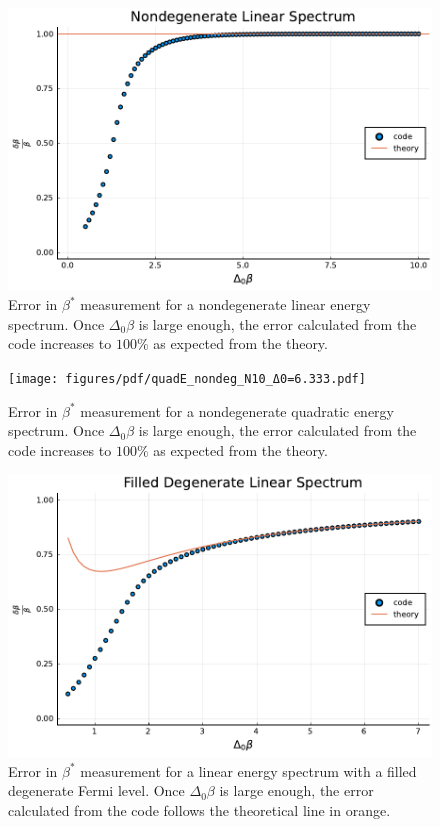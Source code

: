 \begin{figure}[H]
    \centering
    \includegraphics[scale=.75]{figures/pdf/linE_nondeg_N10.pdf}
    \caption{Error in $\beta^*$ measurement for a nondegenerate linear energy spectrum. Once $\Delta_0\beta$ is large enough, the error calculated from the code increases to $100\%$ as expected from the theory. }
    \label{fig:linnondeg}
\end{figure}
\begin{figure}[H]
    \centering
    \texttt{[image: figures/pdf/quadE\_nondeg\_N10\_Δ0=6.333.pdf]}
    \caption{Error in $\beta^*$ measurement for a nondegenerate quadratic energy spectrum. Once $\Delta_0\beta$ is large enough, the error calculated from the code increases to $100\%$ as expected from the theory. }
    \label{fig:quadnondeg}
\end{figure}
\begin{figure}[H]
    \centering
    \includegraphics[scale=0.75]{figures/pdf/linE_filldegen_g0-2_N10.pdf}
    \caption{Error in $\beta^*$ measurement for a linear energy spectrum with a filled degenerate Fermi level. Once $\Delta_0\beta$ is large enough, the error calculated from the code follows the theoretical line in orange.}
    \label{fig:Filled}
\end{figure}
